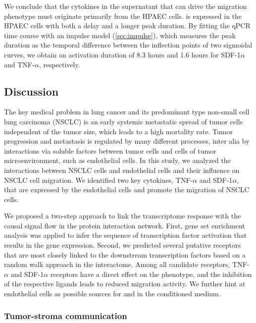 We conclude that the cytokines in the supernatant that can drive the migration
phenotype
must originate primarily from the HPAEC cells.  
\sdfonea is expressed in the HPAEC cells with both a delay and a longer peak duration.
By fitting the qPCR time course with an impulse model 
(\ref{sec:impulse}), which measures the peak 
duration as the 
temporal difference between the inflection points of two
sigmoidal curves, 
we obtain an activation duration of  8.3 hours and 1.6 hours for SDF-1$\alpha$
and TNF-$\alpha$, respectively.

\clearpage
\subsection{Discussion}

The key medical problem in lung cancer and its predominant type non-small 
cell lung carcinoma (NSCLC) is an early systemic metastatic spread of tumor cells 
independent of the tumor size, which leads to a high mortality rate. Tumor progression 
and metastasis is regulated by many different processes, inter alia by interactions 
via soluble factors between tumor cells and cells of tumor microenvironment, such as 
endothelial cells. In this study, we analyzed the interactions between NSCLC cells 
and endothelial cells and their influence on NSCLC cell migration. We identified 
two key cytokines, TNF-$\alpha$ and SDF-1$\alpha$, that are expressed by the 
endothelial cells and promote the migration of NSCLC cells.

We proposed a two-step approach to link the transcriptome response
with the causal signal flow in the protein interaction network. First, gene set
enrichment analysis was applied to infer the sequence of transcription factor
activation that results in the gene expression. Second, we predicted several
putative receptors that are most closely linked to the downstream transcription
factors based on 
a random walk approach in the interactome. Among all candidate receptors,
TNF-$\alpha$ and SDF-1$\alpha$ receptors have a direct effect on the phenotype,
and the inhibition of the respective ligands leads to reduced migration 
activity. We further
hint at endothelial cells as possible sources for \tnfa and \sdfonea in the conditioned medium.

\subsubsection{Tumor-stroma communication}

